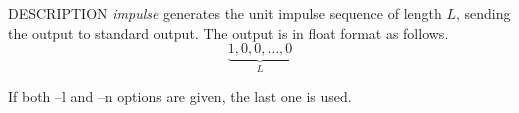 % 
% 
% 
% 
%                                                                        
%

\begin{synopsis}
\item[impulse] [ --l $L$ ] [ --n $N$ ]
\end{synopsis}

\begin{qsection}{DESCRIPTION}
{\em impulse} generates the unit impulse sequence of length $L$, 
sending the output to standard output. 
The output is in float format as follows.
\begin{displaymath}
\underbrace{1, 0, 0, \dots, 0}_{L}
\end{displaymath}

If both --l and --n options are given, the last one is used.
\end{qsection}

